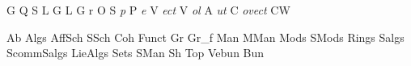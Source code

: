  {{\cal G \hspace{-0.2em} Q \/}}
 {{\cal S \hspace{-0.2em} L \/}}
 {{\cal G \hspace{-0.2em} L \/}} {{\cal G \hspace{-0.2em} r \/}}
 {{\cal O \hspace{-0.2em} S \hspace{-0.3em} \it p\/}}
 {{\cal P \hspace{-1.5pt} \it e\/}}
 {{\cal V \hspace{-1.5pt} \it e\hspace{-0.1ex}c\hspace{-0.1ex}t\/}}
 {{\cal V \hspace{-1.5pt} \it o\hspace{-0.1ex}l\/}}
 {{\cal A \hspace{-0.2em} \it u\hspace{-0.1em}t\/}}
 {{\cal C \hspace{-1.5pt}
 \it o\hspace{-0.1ex}v\hspace{-0.1ex}e\hspace{-0.1ex}c\hspace{-0.1ex}t\/}}
 {{C\hspace{-0.15ex}W}}


%
%

\newcommand {\ev} {{\bar0}}
\newcommand {\od} {{\bar1}}
\newcommand {\eps} {\varepsilon}
\newcommand {\tto} {\longrightarrow}
\newcommand {\pder}[1] {{\frac{\partial}{\partial {#1}}}}
\newcommand {\pderf}[2] {{\frac{\partial {#1}}{\partial {#2}}}}
\newcommand {\pders}[1] {{\partial/\partial {#1}}}
\newcommand {\pderfs}[2] {{\partial {#1}/\partial {#2}}}

%
%

 {{\sf Ab}}
 {{\sf Algs}}
 {{\sf Aff\;Sch}}
 {{\sf SSch}}
 {{\sf Coh}} {{\sf Funct}}
 {{\sf Gr}}
 {{{\sf Gr}_f}}
 {{\sf Man}}
 {{\sf MMan}}
 {{\sf Mods}}
 {{\sf SMods}}
 {{\sf Rings}}
 {{\sf Salgs}}
 {{\sf ScommSalgs}}
 {{\sf LieAlgs}}
 {{\sf Sets}}
 {{\sf SMan}} {{\sf Sh}}
 {{\sf Top}}
 {{\sf Vebun}}
 {{\sf Bun}}

